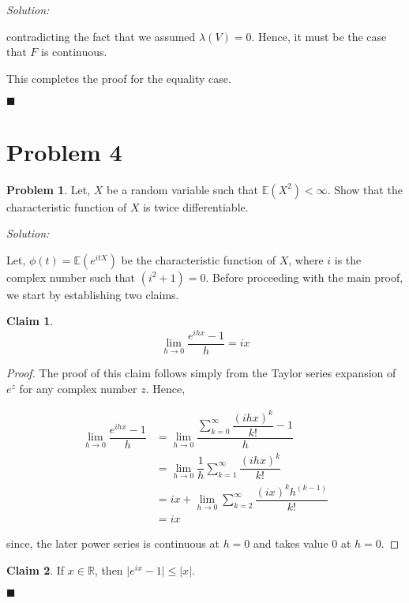 \documentclass[12pt]{article}
\newcommand{\R}{\mathbb{R}}
\newcommand{\E}{\mathbb{E}}
\theoremstyle{definition}
\newtheorem*{prb}{Problem}
\newenvironment{problem}{
\begin{tcolorbox}[colback=blue!5!white,colframe=blue!75!black, parbox = true] \begin{prb}  }{\end{prb}\end{tcolorbox} }
\newenvironment{answer}{\textit{Solution: }\quad }{ \hfill $\blacksquare$}
\newtheorem{claim}{Claim}
\begin{document}
\begin{answer}
\begin{itemize}
		contradicting the fact that we assumed $\lambda(V) = 0$. Hence, it must be the case that $F$ is continuous.
	\end{itemize}

	This completes the proof for the equality case.

\end{answer}

\pagebreak
\section{Problem 4}
\begin{problem}
	Let, $X$ be a random variable such that $\E(X^2) < \infty$. Show that the characteristic function of $X$ is twice differentiable.
\end{problem}

\begin{answer}

	Let, $\phi(t) = \E(e^{itX})$ be the characteristic function of $X$, where $i$ is the complex number such that $(i^2 + 1) = 0$. Before proceeding with the main proof, we start by establishing two claims.

	\begin{claim}
		\label{claim:4-1}
		$$\lim_{h \rightarrow 0} \dfrac{e^{ihx} - 1}{h} = ix$$
	\end{claim}

	\begin{proof}
		The proof of this claim follows simply from the Taylor series expansion of $e^z$ for any complex number $z$. Hence,

		\begin{align*}
			\lim_{h \rightarrow 0} \dfrac{e^{ihx} - 1}{h}
			& = \lim_{h \rightarrow 0} \dfrac{ \sum_{k=0}^{\infty}\dfrac{(ihx)^k}{k!} - 1}{h}\\
			& = \lim_{h \rightarrow 0} \dfrac{1}{h} \sum_{k = 1}^{\infty} \dfrac{(ihx)^k}{k!}\\
			& = ix + \lim_{h \rightarrow 0} \sum_{k = 2}^{\infty} \dfrac{(ix)^k h^{(k-1)} }{k!}\\
			& = ix
		\end{align*}

		since, the later power series is continuous at $h = 0$ and takes value $0$ at $h = 0$.
	\end{proof}

	\begin{claim}
		\label{claim:4-2}
		If $x \in \R$, then $\vert e^{ix} - 1 \vert \leq \vert x \vert$.
	\end{claim}


\end{answer}
\end{document}
